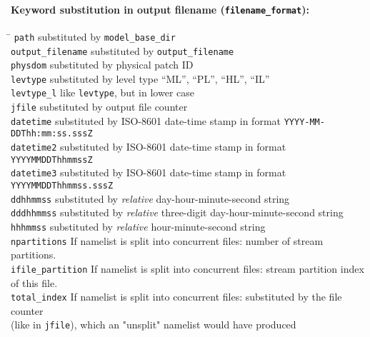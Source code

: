 \paragraph{Keyword substitution in output filename (\texttt{filename\_format}):}
\begin{tabbing}
\hspace*{0.4\textwidth} \= \kill
\texttt{path}              \>  substituted by \texttt{model\_base\_dir}                 \\
\texttt{output\_filename}  \>  substituted by \texttt{output\_filename}                 \\
\texttt{physdom}           \>  substituted by physical patch ID                         \\
\texttt{levtype}           \>  substituted by level type ``ML'', ``PL'', ``HL'', ``IL'' \\
\texttt{levtype\_l}        \>  like \texttt{levtype}, but in lower case                 \\
\texttt{jfile}             \>  substituted by output file counter                       \\
\texttt{datetime}          \>  substituted by ISO-8601 date-time stamp in format \texttt{YYYY-MM-DDThh:mm:ss.sssZ} \\
\texttt{datetime2}         \>  substituted by ISO-8601 date-time stamp in format \texttt{YYYYMMDDThhmmssZ}         \\
\texttt{datetime3}         \>  substituted by ISO-8601 date-time stamp in format \texttt{YYYYMMDDThhmmss.sssZ}     \\
\texttt{ddhhmmss}          \>  substituted by \emph{relative} day-hour-minute-second string \\
\texttt{dddhhmmss}         \>  substituted by \emph{relative} three-digit day-hour-minute-second string \\
\texttt{hhhmmss}           \>  substituted by \emph{relative} hour-minute-second string     \\
\texttt{npartitions}       \>  If namelist is split into concurrent files: number of stream partitions.           \\
\texttt{ifile\_partition}  \>  If namelist is split into concurrent files: stream partition index of this file.   \\
\texttt{total\_index}      \>  If namelist is split into concurrent files: substituted by the file counter \\ 
                           \>  (like in \texttt{jfile}), which an "unsplit" namelist would have produced
\end{tabbing}

